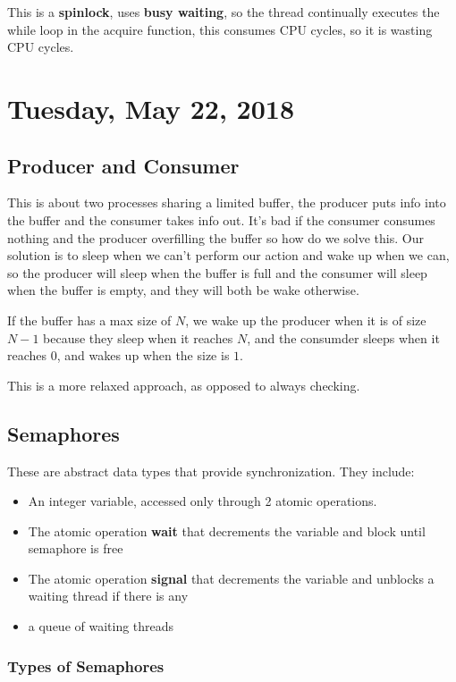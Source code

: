 \documentclass{article}
\begin{document}
This is a \textbf{spinlock}, uses \textbf{busy waiting}, so the thread continually executes the while loop in the acquire function, this consumes CPU cycles, so it is wasting CPU cycles.

\newpage

\section{Tuesday, May 22, 2018}

\subsection{Producer and Consumer}

This is about two processes sharing a limited buffer, the producer puts info into the buffer and the consumer takes info out. It's bad if the consumer consumes nothing and the producer overfilling the buffer so how do we solve this. Our solution is to sleep when we can't perform our action and wake up when we can, so the producer will sleep when the buffer is full and the consumer will sleep when the buffer is empty, and they will both be wake otherwise.

If the buffer has a max size of $N$, we wake up the producer when it is of size $N-1$ because they sleep when it reaches $N$, and the consumder sleeps when it reaches 0, and wakes up when the size is $1$.

This is a more relaxed approach, as opposed to always checking.

\subsection{Semaphores}

These are abstract data types that provide synchronization. They include:
\begin{itemize}
  \item An integer variable, accessed only through 2 atomic operations.
  \item The atomic operation \textbf{wait} that decrements the variable and block until semaphore is free
  \item{The atomic operation \textbf{signal} that decrements the variable and unblocks a waiting thread if there is any}
  \item a queue of waiting threads
\end{itemize}

\subsubsection{Types of Semaphores}
\end{document}
